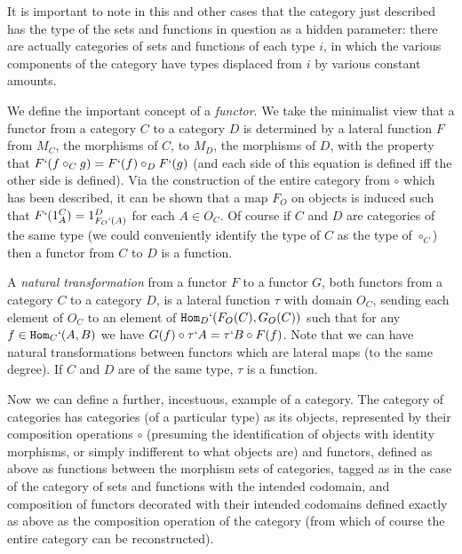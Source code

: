 \documentclass[12pt]{article}
\begin{document}
It is important to note in this and other cases that the category just described has the type of the sets and functions in question as a hidden parameter:  there are actually
categories of sets and functions of each type $i$, in which the various components of the category have types displaced from $i$ by various constant amounts.

We define the important concept of a {\em functor\/}.  We take the minimalist view that a functor from a category $C$ to a category $D$ is determined by a lateral function $F$
from $M_C$, the morphisms of $C$, to $M_D$, the morphisms of $D$, with the property that $F`(f\circ_C g) = F`(f) \circ_D F`(g)$ (and each side of this equation is defined iff
the other side is defined).  Via the construction of the entire category from $\circ$ which has been described, it can be shown that a map $F_O$ on objects is induced such that
$F`(1^C_A) = 1^D_{F_O`(A)}$ for each $A \in O_C$.  Of course if $C$ and $D$ are categories of the same type (we could conveniently identify the type of $C$ as the type of $\circ_C$) then a functor from $C$ to $D$ is a function.

A {\em natural transformation\/} from a functor $F$ to a functor $G$, both functors from a category $C$ to a category $D$, is a lateral function $\tau$ with domain $O_C$, sending each element of $O_C$ to an element
of ${\tt Hom}_D`(F_O(C),G_O(C))$  such that for any $f \in {\tt Hom}_C`(A,B)$ we have $G(f) \circ \tau`A = \tau`B \circ F(f)$.  Note that we can have natural transformations between functors which are lateral maps (to the same degree).  If $C$ and $D$ are of the same type, $\tau$ is a function.

Now we can define a further, incestuous, example of a category.  The category of categories has categories (of a particular type) as its objects, represented by their composition operations $\circ$ (presuming the identification of objects with identity morphisms, or simply indifferent to what objects are) and functors, defined as above as functions between the morphism sets of categories, tagged as in the case of the category of sets and functions with the intended codomain, and composition of functors decorated with their intended codomains defined exactly as above as the composition operation of the category (from which of course the entire category can be reconstructed).
\end{document}
